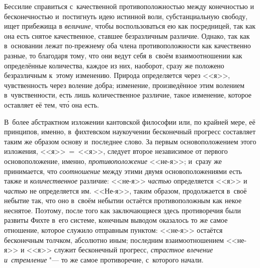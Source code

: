 Бессилие справиться с~качественной противоположностью между конечностью и
бесконечностью и~постигнуть идею истинной воли, субстанциальную свободу, ищет
прибежища в {\em величине,} чтобы воспользоваться ею как посредницей, так как
она есть снятое качественное, ставшее безразличным различие. Однако, так как
в~основании лежат по-прежнему оба члена противоположности как качественно
разные, то благодаря тому, что они ведут себя в~своём взаимоотношении как
определённые количества, каждое из них, наоборот, сразу же положено
безразличным к~этому изменению. Природа определяется через <<я>>, чувственность
через воление добра; изменение, произведённое этим волением в~чувственности,
есть лишь количественное различие, такое изменение, которое оставляет её тем,
чт\'{о} она есть.

В~более абстрактном изложении кантовской философии или, по крайней мере, её
принципов, именно, в~фихтевском наукоучении бесконечный прогресс составляет таким
же образом основу и~последнее слово. За первым основоположением этого
изложения, <<я>>~=~<<я>>, следует второе независимое от первого
основоположение, именно, {\em противоположение} <<не-я>>; и~сразу же
принимается, что {\em соотношение} между этими двумя основоположениями есть
также и {\em количественное} различие: <<не-я>> {\em частью} определяется <<я>>
и {\em частью} не определяется им. <<Не-я>>, таким образом, продолжается в~своё
небытие так, что оно в~своём небытии остаётся противоположным как некое
неснятое. Поэтому, после того как заключающиеся здесь противоречия были развиты
Фихте в~его системе, конечным выводом оказалось то же самое отношение, которое
служило отправным пунктом: <<не-я>> остаётся бесконечным
толчком, абсолютно иным; последним
взаимоотношением <<не-я>> и <<я>> служит бесконечный прогресс, {\em страстное
влечение и~стремление} "--- то же самое противоречие, с~которого начали.


